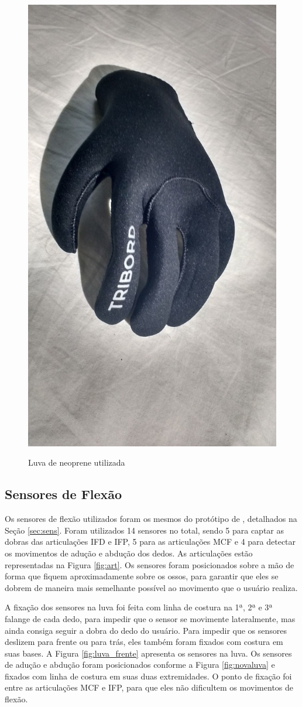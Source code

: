 \begin{figure}[H]
  \setlength{\abovecaptionskip}{0pt}
  \setlength{\belowcaptionskip}{0pt}
  \caption[Luva de neoprene utilizada]{Luva de neoprene utilizada}
  \centering
  \includegraphics[trim=0 400 100 200,clip,width=.4\textwidth,angle=90]{imagem/luvaneoprene}
  \captionsetup{justification=centering}
  \label{fig:luva_neoprene}
\end{figure}


\subsection{Sensores de Flexão} %
\label{sub:sensores_de_flexao}
Os sensores de flexão utilizados foram os mesmos do protótipo de , detalhados na Seção \ref{sec:sens}. Foram utilizados 14 sensores no total, sendo 5 para captar as dobras das articulações \ac{IFD} e \ac{IFP}, 5 para as articulações \ac{MCF} e 4 para detectar os movimentos de adução e abdução dos dedos. As articulações estão representadas na Figura \ref{fig:art}. Os sensores foram posicionados sobre a mão de forma que fiquem aproximadamente sobre os ossos, para garantir que eles se dobrem de maneira mais semelhante possível ao movimento que o usuário realiza.

A fixação dos sensores na luva foi feita com linha de costura na 1ª, 2ª e 3ª falange de cada dedo, para impedir que o sensor se movimente lateralmente, mas ainda consiga seguir a dobra do dedo do usuário. Para impedir que os sensores deslizem para frente ou para trás, eles também foram fixados com costura em suas bases. A Figura \ref{fig:luva_frente} apresenta os sensores na luva. Os sensores de adução e abdução foram posicionados conforme a Figura \ref{fig:novaluva} e fixados com linha de costura em suas duas extremidades. O ponto de fixação foi entre as articulações \ac{MCF} e \ac{IFP}, para que eles não dificultem os movimentos de flexão.

